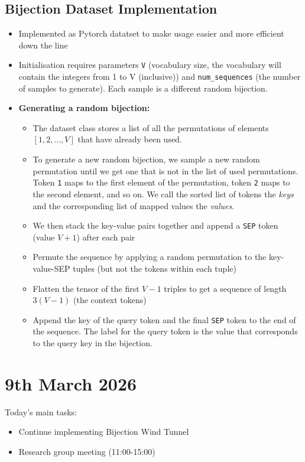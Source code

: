 \documentclass[12pt,a4paper,twoside]{article}
\begin{document}
\subsection{Bijection Dataset Implementation}
\begin{itemize}
	\item Implemented as Pytorch datatset to make usage easier and more efficient down the line
	\item Initialisation requires parameters \texttt{V} (vocabulary size, the vocabulary will contain the integers from 1 to V (inclusive)) and \texttt{num\_sequences} (the number of samples to generate). Each sample is a different random bijection.
	\item \textbf{Generating a random bijection:}
	\begin{itemize}
		\item The dataset class stores a list of all the permutations of elements $[1, 2, \ldots, V]$ that have already been used.
		\item[1] To generate a new random bijection, we sample a new random permutation until we get one that is not in the list of used permutations. Token \texttt{1} maps to the first element of the permutation, token \texttt{2} maps to the second element, and so on. We call the sorted list of tokens the \textit{keys} and the corresponding list of mapped values the \textit{values}.
		\item[2] We then stack the key-value pairs together and append a \texttt{SEP} token (value $V+1$) after each pair
		\item[3] Permute the sequence by applying a random permutation to the key-value-SEP tuples (but not the tokens within each tuple)
		\item[4] Flatten the tensor of the first $V-1$ triples to get a sequence of length $3(V-1)$ (the context tokens)
		\item[5] Append the key of the query token and the final \texttt{SEP} token to the end of the sequence. The label for the query token is the value that corresponds to the query key in the bijection. 
	\end{itemize}
\end{itemize}

\section{9th March 2026}

\begin{summary}
	Today's main tasks:
	\begin{itemize}[leftmargin=*]
		\item Continue implementing Bijection Wind Tunnel
		\item Research group meeting (11:00-15:00)
	\end{itemize}
\end{summary}
\end{document}
